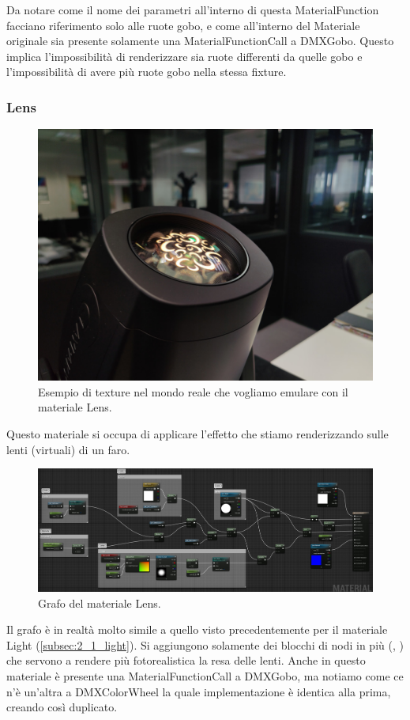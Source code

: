 \documentclass[main.tex]{subfiles}
\begin{document}
Da notare come il nome dei parametri all'interno di questa MaterialFunction facciano riferimento solo alle ruote gobo, e come all'interno del Materiale originale sia presente solamente una MaterialFunctionCall a DMXGobo. Questo implica l'impossibilità di renderizzare sia ruote differenti da quelle gobo e l'impossibilità di avere più ruote gobo nella stessa fixture.

\clearpage %
\subsubsection{Lens}\label{subsec:2_1_lens}
\begin{figure}[H]
    \centering
    \includegraphics[width=0.5\linewidth]{img/renderingPipeline/Lens.jpg}
    \caption{Esempio di texture nel mondo reale che vogliamo emulare con il materiale Lens.}
    \label{fig:2_Lens}
\end{figure}
Questo materiale si occupa di applicare l'effetto che stiamo renderizzando sulle lenti (virtuali) di un faro.
\begin{figure}[H]
    \centering
    \includegraphics[width=1\linewidth]{img/renderingPipeline/LensMaterialFull.jpg}
    \caption{Grafo del materiale Lens.}
    \label{fig:2_lensGraphFull}
\end{figure}
\noindent Il grafo è in realtà molto simile a quello visto precedentemente per il materiale Light (\ref{subsec:2_1_light}). Si aggiungono solamente dei blocchi di nodi in più (, ) che servono a rendere più fotorealistica la resa delle lenti. Anche in questo materiale è presente una MaterialFunctionCall a DMXGobo, ma notiamo come ce n'è un'altra a DMXColorWheel la quale implementazione è identica alla prima, creando così  duplicato.
\end{document}
